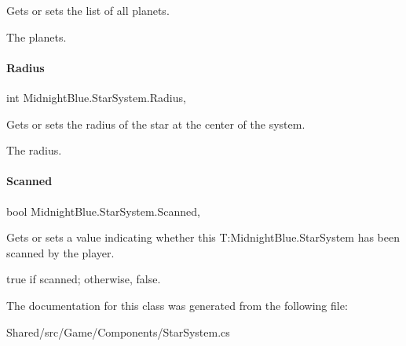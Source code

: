 Gets or sets the list of all planets. 

The planets.\hypertarget{class_midnight_blue_1_1_star_system_ad837a031fcd4a423ebb79cd8531d8a20}{}\label{class_midnight_blue_1_1_star_system_ad837a031fcd4a423ebb79cd8531d8a20} 
\paragraph{\texorpdfstring{Radius}{Radius}}
{\footnotesize\ttfamily int Midnight\+Blue.\+Star\+System.\+Radius\hspace{0.3cm}{\ttfamily [get]}, {\ttfamily [set]}}



Gets or sets the radius of the star at the center of the system. 

The radius.\hypertarget{class_midnight_blue_1_1_star_system_ae0486aa129a103b96f1fbfe9e09b41ca}{}\label{class_midnight_blue_1_1_star_system_ae0486aa129a103b96f1fbfe9e09b41ca} 
\paragraph{\texorpdfstring{Scanned}{Scanned}}
{\footnotesize\ttfamily bool Midnight\+Blue.\+Star\+System.\+Scanned\hspace{0.3cm}{\ttfamily [get]}, {\ttfamily [set]}}



Gets or sets a value indicating whether this T\+:\+Midnight\+Blue.\+Star\+System has been scanned by the player. 

{\ttfamily true} if scanned; otherwise, {\ttfamily false}.

The documentation for this class was generated from the following file\+:\begin{DoxyCompactItemize}
\item 
Shared/src/\+Game/\+Components/Star\+System.\+cs\end{DoxyCompactItemize}
